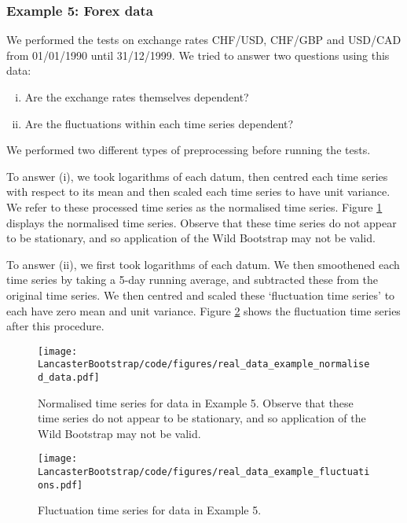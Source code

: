 \documentclass[12pt]{article}
\numberwithin{claim}{section}
\numberwithin{lemma}{section}
\numberwithin{theorem}{section}
\begin{document}
\subsubsection{Example 5: Forex data}

We performed the tests on exchange rates CHF/USD, CHF/GBP and USD/CAD from 01/01/1990 until 31/12/1999. We tried to answer two questions using this data:

\begin{enumerate}[(i)]
\item Are the exchange rates themselves dependent?
\item Are the fluctuations within each time series dependent?
\end{enumerate}

We performed two different types of preprocessing before running the tests.

To answer (i), we took logarithms of each datum, then centred each time series with respect to its mean and then scaled each time series to have unit variance. We refer to these processed time series as the normalised time series. Figure \ref{fig:ex4_processed} displays the normalised time series. Observe that these time series do not appear to be stationary, and so application of the Wild Bootstrap may not be valid.

To answer (ii), we first took logarithms of each datum. We then smoothened each time series by taking a 5-day running average, and subtracted these from the original time series. We then centred and scaled these `fluctuation time series' to each have zero mean and unit variance. Figure \ref{fig:ex4_fluctuations} shows the fluctuation time series after this procedure.


\begin{figure}[htbp]
  \centering
  \texttt{[image: LancasterBootstrap/code/figures/real\_data\_example\_normalised\_data.pdf]}
  \caption{Normalised time series for data in Example 5. Observe that these time series do not appear to be stationary, and so application of the Wild Bootstrap may not be valid.}
  \label{fig:ex4_processed}
\end{figure}

\begin{figure}[htbp]
  \centering
  \texttt{[image: LancasterBootstrap/code/figures/real\_data\_example\_fluctuations.pdf]}
  \caption{Fluctuation time series for data in Example 5.}
  \label{fig:ex4_fluctuations}
\end{figure}
\end{document}
